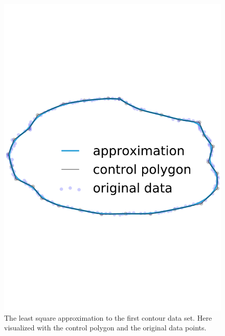 \documentclass[article]{memoir}
\begin{document}
\begin{figure}[htbp]
    \centering
    \includegraphics[width=\linewidth]{../images/example_cropped.pdf}
    \caption{The least square approximation to the first contour data set. Here
    visualized with the control polygon and the original data points.}
    \label{fig:implementation_example}
\end{figure}
\end{document}
